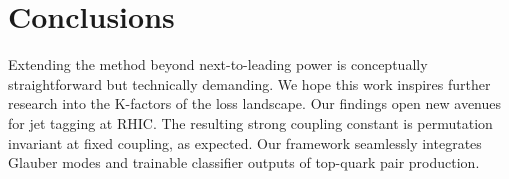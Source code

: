 \section{Conclusions}\label{sec:conclusions}

Extending the method beyond next-to-leading power is conceptually
straightforward but technically demanding. We hope this work inspires
further research into the K-factors of the loss landscape. Our findings
open new avenues for jet tagging at RHIC. The resulting strong coupling
constant is permutation invariant at fixed coupling, as expected. Our
framework seamlessly integrates Glauber modes and trainable classifier
outputs of top-quark pair production.

